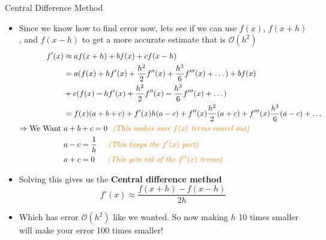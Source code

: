 {}\documentclass[letterpaper,
compress,
xcolor=x11names,
]{beamer}
\begin{document}

\begin{frame}{Central Difference Method}
	\footnotesize
	\begin{itemize}
		\item Since we know how to find error now, lets see if we can use $f(x)$, $f(x+h)$, and $f(x-h)$ to get a more accurate estimate that is $\mathcal{O}(h^2)$
		\tiny
		\begin{align*}
			f'(x) & \approx af(x+h) + bf(x) + cf(x-h) \\
			&= a(f(x) + hf'(x) + \frac{h^2}{2}f''(x) + \frac{h^3}{6}f'''(x) + \dots) + bf(x) \\
			& + c(f(x) - hf'(x) + \frac{h^2}{2}f''(x) - \frac{h^3}{6}f'''(x) + \dots) \\
			&= f(x)(a+b+c) + f'(x)h(a-c) + f''(x)\frac{h^2}{2}(a+c) + f'''(x)\frac{h^3}{6}(a-c) + \dots \\
			\Rightarrow \text{We Want } & a+b+c = 0 \hspace{0.225cm}\text{\textit{\textcolor{orange}{(This makes sure $f(x)$ terms cancel out)}}}\\
			& a-c = \frac{1}{h} \hspace{0.5cm}\text{\textit{\textcolor{orange}{(This keeps the $f'(x)$ part)}}}\\
			& a+c = 0 \hspace{0.58cm}\text{\textit{\textcolor{orange}{(This gets rid of the $f''(x)$ terms)}}}
		\end{align*}
	\footnotesize
		\item Solving this gives us the \textbf{Central difference method}
		\begin{equation*}
			f'(x) \approx \frac{f(x+h) - f(x-h)}{2h}
		\end{equation*}
		\item Which has error $\mathcal{O}(h^2)$ like we wanted. So now making $h$ 10 times smaller will make your error 100 times smaller!
	\end{itemize}
\end{frame}

\end{document}
